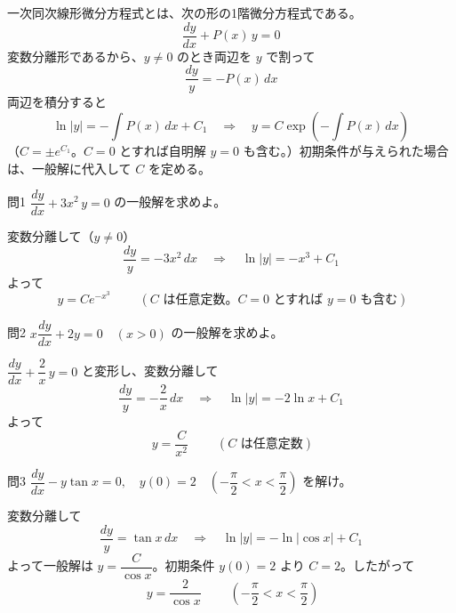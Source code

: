 \documentclass[a4paper,11pt]{article}
\begin{document}


\noindent
一次同次線形微分方程式とは、次の形の1階微分方程式である。
\[
\frac{dy}{dx} + P(x)\,y = 0
\]
変数分離形であるから、$y \neq 0$ のとき両辺を $y$ で割って
\[
\frac{dy}{y} = -P(x)\,dx
\]
両辺を積分すると
\[
\ln|y| = -\int P(x)\,dx + C_{1}
\quad\Longrightarrow\quad
y = C\exp\left(-\int P(x)\,dx\right)
\]
（$C = \pm e^{C_{1}}$。$C = 0$ とすれば自明解 $y = 0$ も含む。）初期条件が与えられた場合は、一般解に代入して $C$ を定める。

\clearpage
\begin{mondaiboxS}{問1}
$\dfrac{dy}{dx} + 3x^{2}\,y = 0$ の一般解を求めよ。
\end{mondaiboxS}
\kaitou
変数分離して（$y \neq 0$）
\[
\frac{dy}{y} = -3x^{2}\,dx
\quad\Longrightarrow\quad
\ln|y| = -x^{3} + C_{1}
\]
よって
\[
\boxed{\; y = Ce^{-x^{3}} \;}
\qquad (C \text{ は任意定数。} C = 0 \text{ とすれば } y = 0 \text{ も含む})
\]

\clearpage
\begin{mondaiboxS}{問2}
$x\dfrac{dy}{dx} + 2y = 0 \quad (x > 0)$ の一般解を求めよ。
\end{mondaiboxS}
\kaitou
$\dfrac{dy}{dx} + \dfrac{2}{x}\,y = 0$ と変形し、変数分離して
\[
\frac{dy}{y} = -\frac{2}{x}\,dx
\quad\Longrightarrow\quad
\ln|y| = -2\ln x + C_{1}
\]
よって
\[
\boxed{\; y = \frac{C}{x^{2}} \;}
\qquad (C \text{ は任意定数})
\]

\clearpage
\begin{mondaiboxS}{問3}
$\dfrac{dy}{dx} - y\tan x = 0, \quad y(0) = 2 \quad \left(-\dfrac{\pi}{2} < x < \dfrac{\pi}{2}\right)$ を解け。
\end{mondaiboxS}
\kaitou
変数分離して
\[
\frac{dy}{y} = \tan x\,dx
\quad\Longrightarrow\quad
\ln|y| = -\ln|\cos x| + C_{1}
\]
よって一般解は $y = \dfrac{C}{\cos x}$。初期条件 $y(0) = 2$ より $C = 2$。したがって
\[
\boxed{\; y = \frac{2}{\cos x} \;}
\qquad \left(-\frac{\pi}{2} < x < \frac{\pi}{2}\right)
\]
\end{document}
